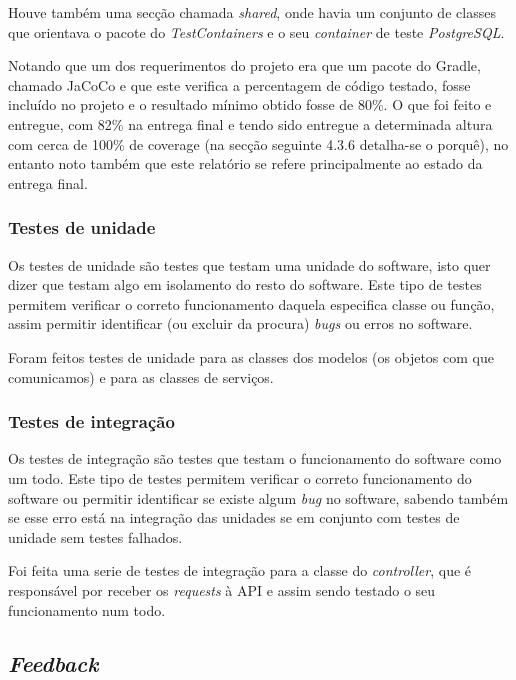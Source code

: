 Houve também uma secção chamada \textit{shared}, onde havia um conjunto de classes que orientava o pacote do \textit{TestContainers} e o seu \textit{container} de teste \textit{PostgreSQL}.

Notando que um dos requerimentos do projeto era que um pacote do Gradle, chamado JaCoCo e que este verifica a percentagem de código testado, fosse incluído no projeto e o resultado mínimo obtido fosse de 80\%. O que foi feito e entregue, com 82\% na entrega final e tendo sido entregue a determinada altura com cerca de  100\% de coverage (na secção seguinte 4.3.6 detalha-se o porquê), no entanto noto também que este relatório se refere principalmente ao estado da entrega final.

\subsubsection{Testes de unidade}

Os testes de unidade são testes que testam uma unidade do software, isto quer dizer que testam algo em isolamento do resto do software. Este tipo de testes permitem verificar o correto funcionamento daquela especifica classe ou função, assim permitir identificar (ou excluir da procura) \textit{bugs} ou erros no software.

Foram feitos testes de unidade para as classes dos modelos (os objetos com que comunicamos) e para as classes de serviços.

\subsubsection{Testes de integração}

Os testes de integração são testes que testam o funcionamento do software como um todo. Este tipo de testes permitem verificar o correto funcionamento do software ou permitir identificar se existe algum \textit{bug} no software, sabendo também se esse erro está na integração das unidades se em conjunto com testes de unidade sem testes falhados.

Foi feita uma serie de testes de integração para a classe do \textit{controller}, que é responsável por receber os \textit{requests} à API e assim sendo testado o seu funcionamento num todo.

\subsection{\textit{Feedback}}

